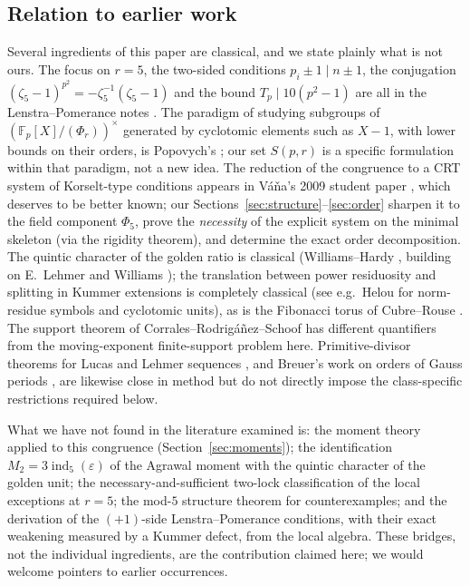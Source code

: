 \documentclass[11pt]{amsart}
\theoremstyle{definition}
\theoremstyle{remark}
\newcommand{\F}{\mathbb{F}}
\newcommand{\eps}{\varepsilon}
\newcommand{\ind}{\operatorname{ind}}
\begin{document}
\subsection*{Relation to earlier work}
Several ingredients of this paper are classical, and we state plainly what
is not ours. The focus on $r = 5$, the two-sided conditions
$p_i \pm 1 \mid n \pm 1$, the conjugation
$(\zeta_5-1)^{p^2} = -\zeta_5^{-1}(\zeta_5-1)$ and the bound
$T_p \mid 10(p^2-1)$ are all in the Lenstra--Pomerance notes \cite{LP}.
The paradigm of studying subgroups of $(\F_p[X]/(\Phi_r))^\times$ generated
by cyclotomic elements such as $X - 1$, with lower bounds on their orders,
is Popovych's \cite{Popovych2009,Popovych2013}; our set $S(p,r)$ is a specific
formulation within that paradigm, not a new idea. The reduction of the
congruence to a CRT system of Korselt-type conditions appears in
V\'a\v na's 2009 student paper \cite{Vana2009}, which deserves to be better
known; our Sections~\ref{sec:structure}--\ref{sec:order} sharpen it to the
field component $\Phi_5$, prove the \emph{necessity} of the explicit system
on the minimal skeleton (via the rigidity theorem), and determine the exact
order decomposition. The quintic character of the golden ratio is classical
(Williams--Hardy \cite{WH1985}, building on E.~Lehmer \cite{Lehmer1966} and
Williams \cite{Williams1975}); the translation between power residuosity
and splitting in Kummer extensions is completely classical (see e.g.\
Helou \cite{Helou} for norm-residue symbols and cyclotomic units), as is
the Fibonacci torus of Cubre--Rouse \cite{CR2014}. The support theorem of
Corrales--Rodrigáñez--Schoof \cite{CorralesSchoof1997} has different
quantifiers from the moving-exponent finite-support problem here.
Primitive-divisor theorems for Lucas and Lehmer sequences
\cite{Voutier1996,BHV2001}, and Breuer's work on orders of Gauss periods
\cite{Breuer2020}, are likewise close in method but do not directly impose
the class-specific restrictions required below.

What we have not found in the literature examined is: the moment theory
applied to this congruence (Section~\ref{sec:moments}); the identification
$M_2 = 3\ind_5(\eps)$ of the Agrawal moment with the quintic character of
the golden unit; the necessary-and-sufficient two-lock classification of
the local exceptions at $r = 5$; the mod-$5$ structure theorem for
counterexamples; and the derivation of the $(+1)$-side Lenstra--Pomerance
conditions, with their exact weakening measured by a Kummer defect, from
the local algebra. These bridges, not the individual ingredients, are the
contribution claimed here; we would welcome pointers to earlier
occurrences.
\end{document}
